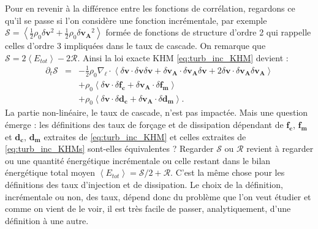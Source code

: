 Pour en revenir à la différence entre les fonctions de corrélation, regardons ce qu'il se passe si l'on considère une fonction incrémentale, par exemple $\mathcal{S} =  \left<\frac{1}{2} \rho_0 \delta \boldsymbol{v}^2 + \frac{1}{2} \rho_0 \delta \boldsymbol{v_A}^2\right>$ formée de fonctions de structure d'ordre 2 qui rappelle celles d'ordre 3 impliquées dans le taux de cascade. On remarque que $\mathcal{S} = 2\left<E_{tot}\right> - 2\mathcal{R}$. Ainsi la loi exacte KHM \eqref{eq:turb_inc_KHM} devient : 
\begin{eqnarray}
\label{eq:turb_inc_KHMs}    \partial_t \mathcal{S} &=& -\frac{1}{2} \rho_0 \nabla_{\boldsymbol{\ell}} \cdot \left< \delta \boldsymbol{v} \cdot \delta \boldsymbol{v} \delta \boldsymbol{v} + \delta \boldsymbol{v_A} \cdot \delta \boldsymbol{v_A} \delta \boldsymbol{v} + 2 \delta \boldsymbol{v} \cdot \delta \boldsymbol{v_A} \delta \boldsymbol{v_A}\right> \\
    &&+ \rho_0 \left<\delta \boldsymbol{v} \cdot \delta \boldsymbol{f_c} + \delta \boldsymbol{v_A} \cdot \delta \boldsymbol{f_m} \right> \\
    &&+ \rho_0 \left<\delta \boldsymbol{v} \cdot \delta \boldsymbol{d_c} + \delta \boldsymbol{v_A} \cdot \delta \boldsymbol{d_m}\right>.
\end{eqnarray}
La partie non-linéaire, le taux de cascade, n'est pas impactée. Mais une question émerge : les définitions des taux de forçage et de dissipation dépendant de $\boldsymbol{f_c}$, $\boldsymbol{f_m}$ et $\boldsymbol{d_c}$, $\boldsymbol{d_m}$ extraites de \eqref{eq:turb_inc_KHM} et celles extraites de \eqref{eq:turb_inc_KHMs} sont-elles équivalentes ? Regarder $\mathcal{S}$ ou $\mathcal{R}$ revient à regarder ou une quantité énergétique incrémentale ou celle restant dans le bilan énergétique total moyen $\left<E_{tot}\right> = \mathcal{S}/2 + \mathcal{R}$. C'est la même chose pour les définitions des taux d'injection et de dissipation. Le choix de la définition, incrémentale ou non, des taux, dépend donc du problème que l'on veut étudier et comme on vient de le voir, il est très facile de passer, analytiquement, d'une définition à une autre.  

\newpage
